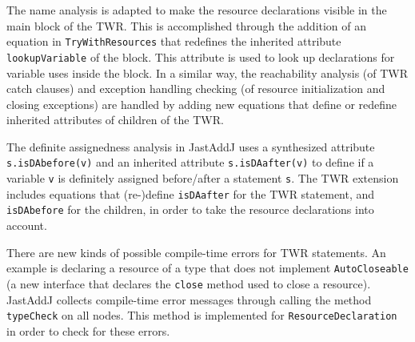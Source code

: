 {%

The name analysis is adapted to make the resource declarations visible in the
main block of the TWR. This is accomplished through the addition of an equation
in \verb'TryWithResources' that redefines the inherited attribute
\verb'lookupVariable' of the block. This attribute is used to look up
declarations for variable uses inside the block. In a similar way, the
reachability analysis (of TWR catch clauses) and exception handling checking
(of resource initialization and closing exceptions) are handled by adding new
equations that define or redefine inherited attributes of children of the TWR.

The definite assignedness analysis in JastAddJ uses a synthesized attribute \texttt{s.isDAbefore(v)} and an inherited attribute \texttt{s.isDAafter(v)} to define if a variable \texttt{v} is definitely assigned before/after a statement \texttt{s}. The TWR extension includes equations that (re-)define \texttt{isDAafter} for the TWR statement, and \texttt{isDAbefore} for the children, in order to take the resource declarations into account.



There are new kinds of possible compile-time errors for TWR statements. An
example is declaring a resource of a type that does not implement
\verb'AutoCloseable' (a new interface that declares the \verb'close' method
used to close a resource). JastAddJ collects compile-time error messages
through calling the method \texttt{typeCheck} on all nodes. This method is
implemented for \texttt{ResourceDeclaration} in order to check for these
errors.

}
